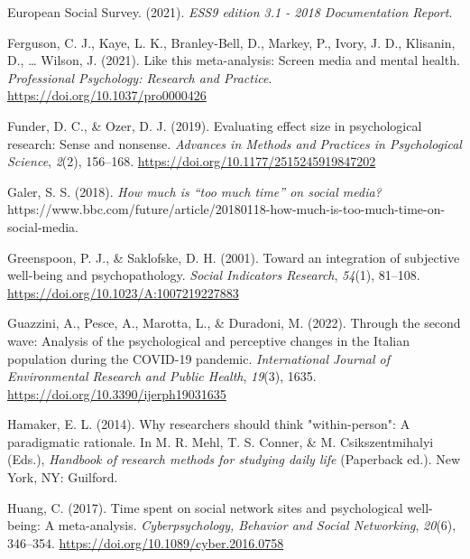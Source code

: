 \documentclass[
  man,mask]{apa6}
\newlength{\cslhangindent}
\newlength{\cslentryspacingunit} %
\newenvironment{CSLReferences}[2] %
 {%
  \setlength{\parindent}{0pt}
  \ifodd #1
  \let\oldpar\par
  \def\par{\hangindent=\cslhangindent\oldpar}
  \fi
  \setlength{\parskip}{#2\cslentryspacingunit}
 }%
 {}
\begin{document}
\begin{CSLReferences}{1}{0}
\leavevmode{}%
European Social Survey. (2021). \emph{{ESS9} edition 3.1 - 2018 {Documentation Report}}.

\leavevmode{}%
Ferguson, C. J., Kaye, L. K., Branley-Bell, D., Markey, P., Ivory, J. D., Klisanin, D., \ldots{} Wilson, J. (2021). Like this meta-analysis: {Screen} media and mental health. \emph{Professional Psychology: Research and Practice}. \url{https://doi.org/10.1037/pro0000426}

\leavevmode{}%
Funder, D. C., \& Ozer, D. J. (2019). Evaluating effect size in psychological research: {Sense} and nonsense. \emph{Advances in Methods and Practices in Psychological Science}, \emph{2}(2), 156--168. \url{https://doi.org/10.1177/2515245919847202}

\leavevmode{}%
Galer, S. S. (2018). \emph{How much is {``too much time''} on social media?} https://www.bbc.com/future/article/20180118-how-much-is-too-much-time-on-social-media.

\leavevmode{}%
Greenspoon, P. J., \& Saklofske, D. H. (2001). Toward an integration of subjective well-being and psychopathology. \emph{Social Indicators Research}, \emph{54}(1), 81--108. \url{https://doi.org/10.1023/A:1007219227883}

\leavevmode{}%
Guazzini, A., Pesce, A., Marotta, L., \& Duradoni, M. (2022). Through the second wave: {Analysis} of the psychological and perceptive changes in the {Italian} population during the {COVID-19} pandemic. \emph{International Journal of Environmental Research and Public Health}, \emph{19}(3), 1635. \url{https://doi.org/10.3390/ijerph19031635}

\leavevmode{}%
Hamaker, E. L. (2014). Why researchers should think "within-person": {A} paradigmatic rationale. In M. R. Mehl, T. S. Conner, \& M. Csikszentmihalyi (Eds.), \emph{Handbook of research methods for studying daily life} (Paperback ed.). {New York, NY}: {Guilford}.

\leavevmode{}%
Huang, C. (2017). Time spent on social network sites and psychological well-being: {A} meta-analysis. \emph{Cyberpsychology, Behavior and Social Networking}, \emph{20}(6), 346--354. \url{https://doi.org/10.1089/cyber.2016.0758}


\end{CSLReferences}
\end{document}
